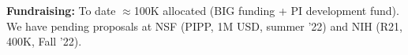 \documentclass[onecolumn, compsoc,12pt]{IEEEtran}
\def\cov{COVID-19\xspace}
\begin{document}
\textbf{Fundraising:} To date $\approx$100K allocated (BIG funding + PI development fund). We have pending proposals at NSF (PIPP, 1M USD, summer '22) and NIH (R21, 400K, Fall '22). 

\clearpage



\setcounter{page}{1}
%
\clearpage

\normalem 




 
\end{document}

